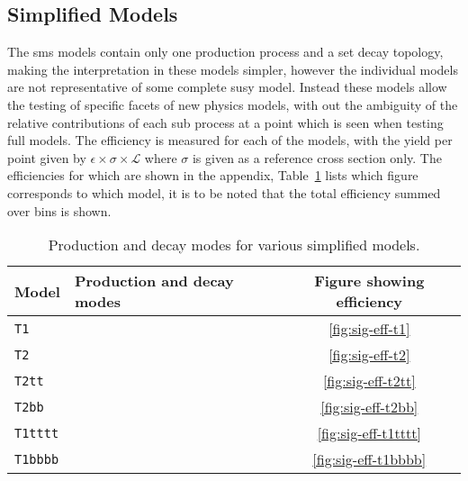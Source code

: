 \subsection{Simplified Models} %
\label{par:simplified_models}
The \ac{sms} models contain only one production process and a set decay 
topology, making the interpretation in these models simpler, however the 
individual models are not representative of some complete \ac{susy} model. 
Instead these models allow the testing of specific facets of new physics 
models, with out the ambiguity of the relative contributions of each sub 
process at a point which is seen when testing full models. The efficiency is 
measured for each of the models, with the yield per point given by 
$\epsilon\times\sigma\times\mathcal{L}$ where $\sigma$ is given as a reference 
cross section only. The efficiencies for which are shown in the appendix, 
Table~\ref{tab:sms-eff} lists which figure corresponds to which model, it is to 
be noted that the total efficiency summed over \HT bins is shown.



\begin{table}[h!]
  \caption{Production and decay modes for various simplified models.}
  \label{tab:sms-eff}
  \centering
  \footnotesize
  \begin{tabular}{ llc }
    \hline
    Model & Production and decay modes & Figure showing efficiency \\ [0.5ex]
    \hline
    \texttt{T1} & \HepProcess{\PSgluino\PSgluino\to\Pquark\APquark\PSneutralino\Pquark\APquark\PSneutralino} & \ref{fig:sig-eff-t1} \\
    \texttt{T2} & \HepProcess{\Psquark\Psquark\to\Pquark\PSneutralino\APquark\PSneutralino} & \ref{fig:sig-eff-t2} \\
    \texttt{T2tt} & \HepProcess{\PStop\PStop\to\Ptop\PSneutralino\APtop\PSneutralino}
& \ref{fig:sig-eff-t2tt} \\
    \texttt{T2bb} & \HepProcess{\PSbottom\PSbottom\to\Pbottom\PSneutralino\APbottom\PSneutralino} & \ref{fig:sig-eff-t2bb} \\
    \texttt{T1tttt} & \HepProcess{\PSgluino\PSgluino\to\Ptop\APtop\PSneutralino\Ptop\APtop\PSneutralino} & \ref{fig:sig-eff-t1tttt} \\
    \texttt{T1bbbb} & \HepProcess{\PSgluino\PSgluino\to\Pbottom\APbottom\PSneutralino\Pbottom\APbottom\PSneutralino} & \ref{fig:sig-eff-t1bbbb} \\
    \hline
  \end{tabular}
\end{table}


